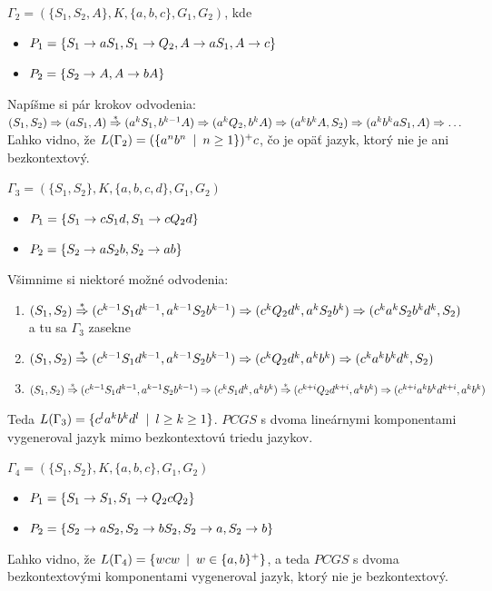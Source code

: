 \begin{priklad}
\label{pcgs_prikl_2} $\Gamma_2=(\{S_1,S_2,A\},K,\{a,b,c\},G_1,G_2)$,
kde
\begin{itemize}
  \item $P_1=\{S_1\rightarrow aS_1,S_1\rightarrow Q_2,A\rightarrow
  aS_1,A\rightarrow c\}$
  \item $P_2=\{S_2\rightarrow A,A\rightarrow bA\}$
\end{itemize}
Napíšme si pár krokov odvodenia: \\ $(S_1,S_2)\Rightarrow
(aS_1,A)\overset{*}{\Rightarrow} (a^kS_1,b^{k-1}A)\Rightarrow (a^k Q_2, b^k A)\Rightarrow
(a^k b^k A, S_2)\Rightarrow (a^k b^k aS_1,A)\Rightarrow \dots$
\\ Ľahko vidno, že $L(\Gamma_2)=(\{a^nb^n\enspace |\enspace
n\geq 1\})^+c$, čo je opäť jazyk, ktorý nie je ani bezkontextový.
\end{priklad}

\begin{priklad}
\label{pcgs_prikl_3} $\Gamma_3=(\{S_1,S_2\},K,\{a,b,c,d\},G_1,G_2)$
\begin{itemize}
  \item $P_1=\{S_1\rightarrow cS_1d,S_1\rightarrow cQ_2d\}$
  \item $P_2=\{S_2\rightarrow aS_2b,S_2\rightarrow ab\}$
\end{itemize}
Všimnime si niektoré možné odvodenia:
\begin{enumerate}
  \item $(S_1,S_2)\overset{*}{\Rightarrow}
  (c^{k-1}S_1d^{k-1},a^{k-1}S_2b^{k-1})\Rightarrow (c^kQ_2d^k,a^kS_2b^k)\Rightarrow
  (c^ka^kS_2b^kd^k,S_2)$ a tu sa $\Gamma_3$ zasekne
  \item $(S_1,S_2)\overset{*}{\Rightarrow}
  (c^{k-1}S_1d^{k-1},a^{k-1}S_2b^{k-1})\Rightarrow (c^kQ_2d^k,a^kb^k)\Rightarrow
  (c^ka^kb^kd^k,S_2)$
  \item $(S_1,S_2)\overset{*}\Ra
  (c^{k-1}S_1d^{k-1},a^{k-1}S_2b^{k-1})\Ra
  (c^kS_1d^k,a^kb^k)\overset{*}\Ra
  (c^{k+i}Q_2d^{k+i},a^kb^k)\Ra\newline
  (c^{k+i}a^kb^kd^{k+i},a^kb^k)$
\end{enumerate}
Teda $L(\Gamma_3)=\{c^la^kb^kd^l\enspace |\enspace l\geq k\geq 1\}$. $PCGS$ s
dvoma lineárnymi komponentami vygeneroval jazyk mimo bezkontextovú
triedu jazykov.
\end{priklad}

\begin{priklad}
$\Gamma_4=(\{S_1,S_2\},K,\{a,b,c\},G_1,G_2)$
\begin{itemize}
  \item $P_1=\{S_1\rightarrow S_1,S_1\rightarrow Q_2cQ_2\}$
  \item $P_2=\{S_2\rightarrow aS_2,S_2\rightarrow bS_2,S_2\rightarrow
  a,S_2\rightarrow b\}$
\end{itemize}
Ľahko vidno, že $L(\Gamma_4)=\{wcw\enspace |\enspace w\in\{a,b\}^+\}$, a teda
$PCGS$ s dvoma bezkontextovými komponentami vygeneroval jazyk,
ktorý nie je bezkontextový.
\end{priklad}

